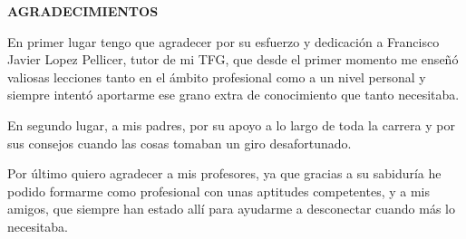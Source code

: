 \begin{center}
{\Large \bfseries AGRADECIMIENTOS}
\vspace{2.5cm}
\end{center}

\par
En primer lugar tengo que agradecer por su esfuerzo y dedicación a Francisco Javier Lopez Pellicer, tutor de mi TFG, que desde el primer momento me enseñó valiosas lecciones tanto en el ámbito profesional como a un nivel personal y siempre intentó aportarme ese grano extra de conocimiento que tanto necesitaba.

\par
En segundo lugar, a mis padres, por su apoyo a lo largo de toda la carrera y por sus consejos cuando las cosas tomaban un giro desafortunado. 

\par 
Por último quiero agradecer a mis profesores, ya que gracias a su sabiduría he podido formarme como profesional con unas aptitudes competentes, y a mis amigos, que siempre han estado allí para ayudarme a desconectar cuando más lo necesitaba. 